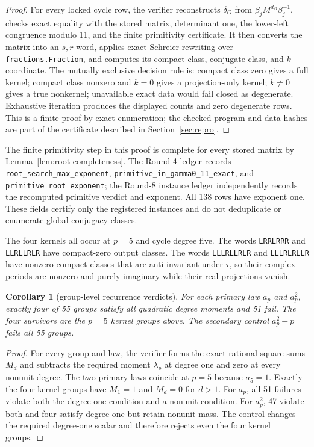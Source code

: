 \documentclass[11pt]{article}
\newtheorem{corollary}[theorem]{Corollary}
\theoremstyle{definition}
\theoremstyle{remark}
\begin{document}
\begin{proof}
For every locked cycle row, the verifier reconstructs $\delta_O$ from $\beta_jM^{d_O}\beta_j^{-1}$, checks exact equality with the stored matrix, determinant one, the lower-left congruence modulo 11, and the finite primitivity certificate. It then converts the matrix into an $s,r$ word, applies exact Schreier rewriting over \texttt{fractions.Fraction}, and computes its compact class, conjugate class, and $k$ coordinate. The mutually exclusive decision rule is: compact class zero gives a full kernel; compact class nonzero and $k=0$ gives a projection-only kernel; $k\neq0$ gives a true nonkernel; unavailable exact data would fail closed as degenerate. Exhaustive iteration produces the displayed counts and zero degenerate rows. This is a finite proof by exact enumeration; the checked program and data hashes are part of the certificate described in Section~\ref{sec:repro}.
\end{proof}

The finite primitivity step in this proof is complete for every stored matrix by Lemma~\ref{lem:root-completeness}. The Round-4 ledger records \texttt{root\_search\_max\_exponent}, \texttt{primitive\_in\_gamma0\_11\_exact}, and \texttt{primitive\_root\_exponent}; the Round-8 instance ledger independently records the recomputed primitive verdict and exponent. All 138 rows have exponent one. These fields certify only the registered instances and do not deduplicate or enumerate global conjugacy classes.

The four kernels all occur at $p=5$ and cycle degree five. The words \texttt{LRRLRRR} and \texttt{LLRLLRLR} have compact-zero output classes. The words \texttt{LLLRLLRLR} and \texttt{LLLRLRLLR} have nonzero compact classes that are anti-invariant under $\tau$, so their complex periods are nonzero and purely imaginary while their real projections vanish.

\begin{corollary}[group-level recurrence verdicts]\label{cor:groups}
For each primary law $a_p$ and $a_p^2$, exactly four of 55 groups satisfy all quadratic degree moments and 51 fail. The four survivors are the $p=5$ kernel groups above. The secondary control $a_p^2-p$ fails all 55 groups.
\end{corollary}

\begin{proof}
For every group and law, the verifier forms the exact rational square sums $M_d$ and subtracts the required moment $\lambda_p$ at degree one and zero at every nonunit degree. The two primary laws coincide at $p=5$ because $a_5=1$. Exactly the four kernel groups have $M_1=1$ and $M_d=0$ for $d>1$. For $a_p$, all 51 failures violate both the degree-one condition and a nonunit condition. For $a_p^2$, 47 violate both and four satisfy degree one but retain nonunit mass. The control changes the required degree-one scalar and therefore rejects even the four kernel groups.
\end{proof}
\end{document}
